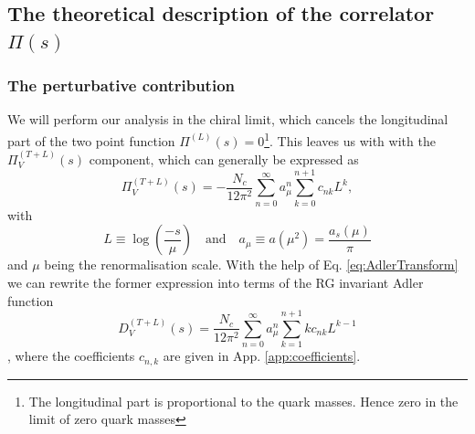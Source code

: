 \subsection{The theoretical description of the correlator $\Pi(s)$}
\subsubsection{The perturbative contribution}
We will perform our analysis in the chiral limit, which cancels the longitudinal part of the two point function $\Pi^{(L)}(s) = 0$\footnote{The longitudinal part is proportional to the quark masses. Hence zero in the limit of zero quark masses}. This leaves us with with the $\Pi_V^{(T+L)}(s)$ component, which can generally be expressed as \cite{Jamin2008}
\begin{equation}
	\Pi^{(T+L)}_V (s) = - \frac{N_c}{12 \pi^2} \sum_{n=0}^{\infty} a_\mu^n \sum_{k=0}^{n+1} c_{nk} L^k,
\end{equation}
with
\begin{equation}
	L\equiv\log\left(\frac{-s}{\mu}\right) \quad \text{and} \quad a_\mu \equiv a(\mu^2) = \frac{a_s(\mu)}{\pi}
\end{equation}
and $\mu$ being the renormalisation scale.
With the help of Eq. \eqref{eq:AdlerTransform} we can rewrite the former expression into terms of the RG invariant Adler function
\begin{equation}
	D_V^{(T+L)} (s) = \frac{N_c}{12 \pi^2} \sum_{n=0}^\infty a_\mu^n \sum_{k=1}^{n+1} k c_{nk} L^{k-1}
\end{equation},
where the coefficients $c_{n,k}$ are given in App. \ref{app:coefficients}.